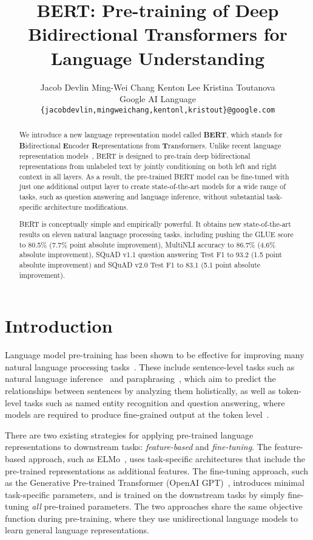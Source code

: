 \documentclass[11pt,a4paper]{article}
\title{\textbf{BERT}: Pre-training of Deep Bidirectional Transformers for \\ Language Understanding}
\author{Jacob Devlin \quad Ming-Wei Chang \quad Kenton Lee \quad Kristina Toutanova \\
  Google AI Language \\
  {\tt \{jacobdevlin,mingweichang,kentonl,kristout\}@google.com} \\}
\date{}
\newcommand\bert{BERT\xspace}
\begin{document}
\maketitle
\begin{abstract}
  We introduce a new language representation model called {\bf \bert}, which stands for \textbf{B}idirectional \textbf{E}ncoder \textbf{R}epresentations from \textbf{T}ransformers. Unlike recent language representation models~\cite{peters-etal:2018:_deep, radford-etal:2018},  \bert is designed to pre-train deep bidirectional representations from unlabeled text by jointly conditioning on both left and right context in all layers. As a result, the pre-trained BERT model can be fine-tuned with just one additional output layer to create state-of-the-art models for a wide range of tasks, such as question answering and language inference, without substantial task-specific architecture modifications. 

\bert is conceptually simple and empirically powerful. It obtains new state-of-the-art results on eleven natural language processing tasks, including pushing the GLUE score to 80.5\% (7.7\% point absolute improvement), MultiNLI accuracy to 86.7\% (4.6\% absolute improvement), SQuAD v1.1 question answering Test F1 to 93.2 (1.5 point absolute improvement) and SQuAD v2.0 Test F1 to 83.1 (5.1 point absolute improvement).

 \end{abstract}

\section{Introduction}


Language model pre-training has been shown to be effective for improving many natural language processing tasks~\cite{dai-le:2015:_semi, peters-etal:2018:_deep, radford-etal:2018, howard-ruder:2018}. These include sentence-level tasks such as natural language inference~\cite{bowman-etal:2015, williams-nangia-bowman:2018} and paraphrasing~\cite{dolan-brockett:2005:_autom}, which aim to predict the relationships between sentences by analyzing them holistically, as well as token-level tasks such as named entity recognition and question answering, where models are required to produce fine-grained output at the token level~\cite{tjong-de:2003, rajpurkar-etal:2016:_squad}.


There are two existing strategies for applying pre-trained language representations to downstream tasks: {\em feature-based} and {\em fine-tuning}. The feature-based approach, such as ELMo~\cite{peters-etal:2018:_deep}, uses task-specific architectures that include the pre-trained representations as additional features. The fine-tuning approach, such as the Generative Pre-trained Transformer (OpenAI GPT)~\cite{radford-etal:2018}, introduces minimal task-specific parameters, and is trained on the downstream tasks by simply fine-tuning {\em all} pre-trained parameters. The two approaches share the same objective function during pre-training, where they use unidirectional language models to learn general language representations.
\end{document}
